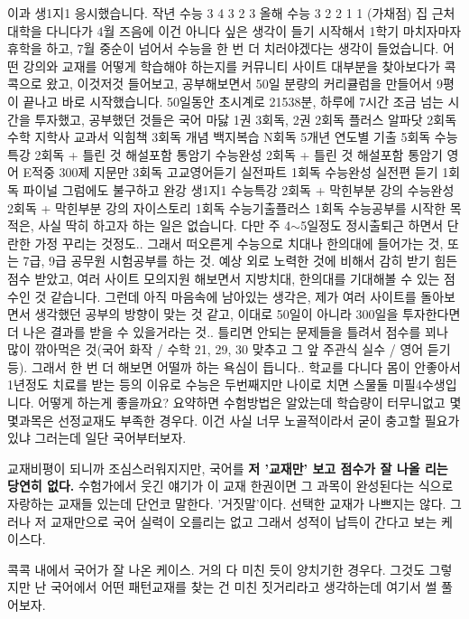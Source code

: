 이과 생1지1 응시했습니다. 작년 수능 3 4 3 2 3 올해 수능 3 2 2 1 1 (가채점) 집 근처 대학을 다니다가 4월 즈음에 이건 아니다 싶은 생각이 들기 시작해서 1학기 마치자마자 휴학을 하고, 7월 중순이 넘어서 수능을 한 번 더 치러야겠다는 생각이 들었습니다. 어떤 강의와 교재를 어떻게 학습해야 하는지를 커뮤니티 사이트 대부분을 찾아보다가 콕콕으로 왔고, 이것저것 들어보고, 공부해보면서 50일 분량의 커리큘럼을 만들어서 9평이 끝나고 바로 시작했습니다. 50일동안 초시계로 21538분, 하루에 7시간 조금 넘는 시간을 투자했고, 공부했던 것들은 국어 마닳 1권 3회독, 2권 2회독 플러스 알파닷 2회독 수학 지학사 교과서 익힘책 3회독 개념 백지복습 N회독 5개년 연도별 기출 5회독 수능특강 2회독 + 틀린 것 해설포함 통암기 수능완성 2회독 + 틀린 것 해설포함 통암기 영어 E적중 300제 지문만 3회독 고교영어듣기 실전파트 1회독 수능완성 실전편 듣기 1회독 파이널 그럼에도 불구하고 완강 생1지1 수능특강 2회독 + 막힌부분 강의 수능완성 2회독 + 막힌부분 강의 자이스토리 1회독 수능기출플러스 1회독 수능공부를 시작한 목적은, 사실 딱히 하고자 하는 일은 없습니다. 다만 주 4$\sim$5일정도 정시출퇴근 하면서 단란한 가정 꾸리는 것정도.. 그래서 떠오른게 수능으로 치대나 한의대에 들어가는 것, 또는 7급, 9급 공무원 시험공부를 하는 것. 예상 외로 노력한 것에 비해서 감히 받기 힘든 점수 받았고, 여러 사이트 모의지원 해보면서 지방치대, 한의대를 기대해볼 수 있는 점수인 것 같습니다. 그런데 아직 마음속에 남아있는 생각은, 제가 여러 사이트를 돌아보면서 생각했던 공부의 방향이 맞는 것 같고,  이대로 50일이 아니라 300일을 투자한다면 더 나은 결과를 받을 수 있을거라는 것.. 틀리면 안되는 문제들을 틀려서 점수를 꾀나 많이 깎아먹은 것(국어 화작 / 수학 21, 29, 30 맞추고 그 앞 주관식 실수 / 영어 듣기 등). 그래서 한 번 더 해보면 어떨까 하는 욕심이 듭니다.. 학교를 다니다 몸이 안좋아서 1년정도 치료를 받는 등의 이유로 수능은 두번째지만 나이로 치면 스물둘 미필4수생입니다. 어떻게 하는게 좋을까요?
요약하면 수험방법은 알았는데 학습량이 터무니없고 몇몇과목은 선정교재도 부족한 경우다.
이건 사실 너무 노골적이라서 굳이 충고할 필요가 있냐 그러는데 일단 국어부터보자.
\vspace{5mm}

교재비평이 되니까 조심스러워지지만, 국어를 \textbf{저 '교재만' 보고 점수가 잘 나올 리는 당연히 없다.}
수험가에서 웃긴 얘기가 이 교재 한권이면 그 과목이 완성된다는 식으로 자랑하는 교재들 있는데 단언코 말한다. '거짓말'이다.
선택한 교재가 나쁘지는 않다. 그러나 저 교재만으로 국어 실력이 오를리는 없고 그래서 성적이 납득이 간다고 보는 케이스다.
\vspace{5mm}

콕콕 내에서 국어가 잘 나온 케이스. 거의 다 미친 듯이 양치기한 경우다.
그것도 그렇지만 난 국어에서 어떤 패턴교재를 찾는 건 미친 짓거리라고 생각하는데 여기서 썰 풀어보자.
\vspace{5mm}

